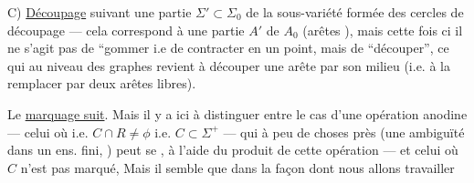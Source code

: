 C) \uline{Découpage}  suivant une partie 
$\Sigma'\subset\Sigma_0$ de la sous-variété formée des cercles de découpage --- cela correspond à une partie $A'$ de $A_0$ (arêtes  ), mais cette fois ci il ne s'agit pas de ``gommer i.e de contracter en un point, mais de ``découper'', ce qui au niveau des graphes revient à découper une arête par son milieu (i.e. à la remplacer par deux arêtes libres).

Le \uline{marquage suit}. 
Mais il y a ici à distinguer entre le cas d'une opération anodine  --- celui
où 
 i.e. $C\cap R\ne\phi$ i.e. $C\subset\Sigma^+$ --- qui à peu de choses près (une ambiguïté dans un ens. fini, \deleted{)} ) peut se , à l'aide du produit de cette opération --- et celui où $C$ n'est pas marqué,
Mais il semble que dans la façon dont nous allons travailler
